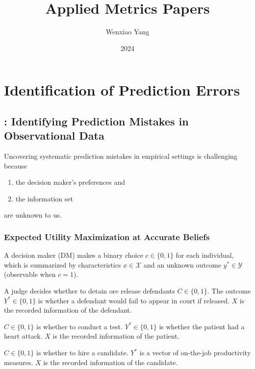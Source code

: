 \documentclass[11pt]{elegantbook}
\title{Applied Metrics Papers}
\author{Wenxiao Yang}
\institute{Haas School of Business, University of California Berkeley}
\date{2024}
\begin{document}
\maketitle

\frontmatter
\tableofcontents

\mainmatter

\chapter{Identification of Prediction Errors}
\section{\cite{rambachan2024identifying}: Identifying Prediction Mistakes in Observational Data}
Uncovering systematic prediction mistakes in empirical settings is challenging because
\begin{enumerate}
    \item the decision maker's preferences and
    \item the information set
\end{enumerate}
are unknown to us.

\subsection{Expected Utility Maximization at Accurate Beliefs}
A decision maker (DM) makes a binary choice $c\in\{0,1\}$ for each individual, which is summarized by characteristics $x\in \mathcal{X}$ and an unknown outcome $y^*\in \mathcal{Y}$ (observable when $c=1$).

\begin{example}
    A judge decides whether to detain ore release defendants $C\in\{0,1\}$. The outcome $Y^*\in\{0,1\}$ is whether a defendant would fail to appear in court if released. $X$ is the recorded information of the defendant.
\end{example}

\begin{example}
    $C\in\{0,1\}$ is whether to conduct a test. $Y^*\in\{0,1\}$ is whether the patient had a heart attack. $X$ is the recorded information of the patient.
\end{example}

\begin{example}[ (Hiring)]
    $C\in\{0,1\}$ is whether to hire a candidate. $Y^*$  is a vector of on-the-job productivity measures. $X$ is the recorded information of the candidate.
\end{example}
\end{document}
